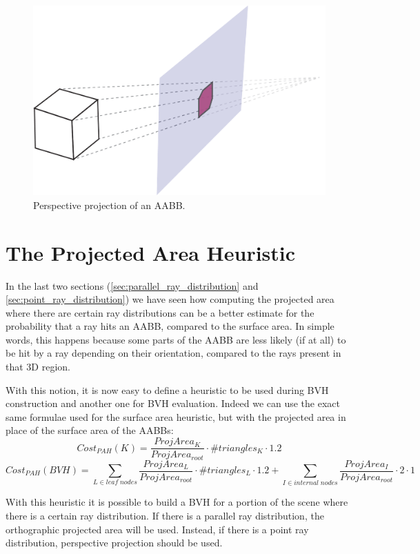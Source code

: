 \documentclass{PoliMi_MasterThesis}
\begin{document}
\begin{figure}[H]
    \centering
    \includegraphics[width=\textwidth*\real{0.6}]{Images/perspective_projection.png}
    \caption{Perspective projection of an AABB.}
    \label{fig:aabb_perspective_projection}
\end{figure}

\section{The Projected Area Heuristic} \label{sec:projected_area_heuristic}
In the last two sections (\ref{sec:parallel_ray_distribution} and \ref{sec:point_ray_distribution}) we have seen how computing the projected area where there are certain ray distributions can be a better estimate for the probability that a ray hits an AABB, compared to the surface area. In simple words, this happens because some parts of the AABB are less likely (if at all) to be hit by a ray depending on their orientation, compared to the rays present in that 3D region. 

With this notion, it is now easy to define a heuristic to be used during BVH construction and another one for BVH evaluation. Indeed we can use the exact same formulae used for the surface area heuristic, but with the projected area in place of the surface area of the AABBs:
$$Cost_{PAH}(K) = \frac{ProjArea_K}{ProjArea_{root}} \cdot \#triangles_K \cdot 1.2$$
$$Cost_{PAH}(BVH) = \sum_{L \in leaf\; nodes} \frac{ProjArea_L}{ProjArea_{root}} \cdot \#triangles_L \cdot 1.2 + \sum_{I \in internal\; nodes} \frac{ProjArea_I}{ProjArea_{root}} \cdot 2 \cdot 1$$

With this heuristic it is possible to build a BVH for a portion of the scene where there is a certain ray distribution. If there is a parallel ray distribution, the orthographic projected area will be used. Instead, if there is a point ray distribution, perspective projection should be used.
\end{document}

